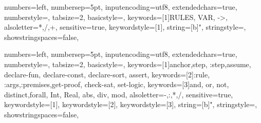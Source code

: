 

\lstset{style=mystyle}

{
  numbers=left,
  numbersep=5pt,
  inputencoding=utf8,
  extendedchars=true,
  numberstyle=\footnotesize,
  tabsize=2,
  basicstyle={\ttfamily\scriptsize\upshape},
  keywords=[1]{RULES, VAR, ->},
  alsoletter={*,/,+},
  sensitive=true,
  keywordstyle={[1]\bfseries\color{ForestGreen}},
  string=[b]{"},
  stringstyle=\color{orange},
  showstringspaces=false,
}

{
  numbers=left,
  numbersep=5pt,
  inputencoding=utf8,
  extendedchars=true,
  numberstyle=\footnotesize,
  tabsize=2,
  basicstyle={\ttfamily\scriptsize\upshape},
  keywords=[1]{anchor,step, :step,assume, declare-fun, declare-const, declare-sort, assert},
  keywords=[2]{:rule, :args,:premises,get-proof, check-sat, set-logic},
  keywords=[3]{and, or, not, distinct,forall, Int, Real, abs, div, mod},
  alsoletter={-,:,*,/},
  sensitive=true,
  keywordstyle={[1]\bfseries\color{ForestGreen}},
  keywordstyle={[2]\bfseries\color{blue}},
  keywordstyle={[3]\bfseries\color{purple}},
  string=[b]{"},
  stringstyle=\color{orange},
  showstringspaces=false,
}

